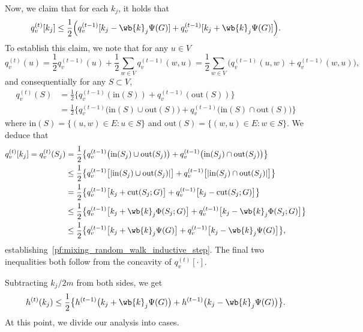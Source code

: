 	Now, we claim that for each $k_j$, it holds that
	\begin{equation}
	\label{pf:mixing_random_walk_inductive_step}
	q_v^{(t)}[k_j] \leq \frac{1}{2}\Bigl(q_v^{(t - 1)}[k_j - \wb{k}_j \Psi(G)] + q_v^{(t - 1)}[k_j + \wb{k}_j \Psi(G)]\Bigr).
	\end{equation}
	To establish this claim, we note that for any $u \in V$
	\begin{equation*}
	q_v^{(t)}(u) = \frac{1}{2}q_v^{(t - 1)}(u) + \frac{1}{2}\sum_{w \in V}q_v^{(t - 1)}(w,u) = \frac{1}{2} \sum_{w \in V} \bigl(q_v^{(t - 1)}(u,w) + q_v^{(t - 1)}(w,u)\bigr),
	\end{equation*}
	and consequentially for any $S \subset V$,
	\begin{align*}
	q_v^{(t)}(S) & = \frac{1}{2}\bigl\{q_v^{(t - 1)}(\mathrm{in}(S)) +  q_v^{(t - 1)}(\mathrm{out}(S))\bigr\} \\
	& = \frac{1}{2}\bigl\{q_v^{(t - 1)}\bigl(\mathrm{in}(S) \cup \mathrm{out}(S)\bigr) +  q_v^{(t - 1)}\bigl(\mathrm{in}(S) \cap \mathrm{out}(S)\bigr)\bigr\}
	\end{align*}
	where $\mathrm{in}(S) = \{(u,w) \in E: u \in S\}$ and $\mathrm{out}(S) = \{(w,u) \in E: w \in S\}$. We deduce that
	\begin{align*}
	q_v^{(t)}[k_j] = q_v^{(t)}(S_j) & = \frac{1}{2}\bigl\{q_v^{(t - 1)}\bigl(\mathrm{in}(S_j) \cup \mathrm{out}(S_j)\bigr) +  q_v^{(t - 1)}\bigl(\mathrm{in}(S_j) \cap \mathrm{out}(S_j)\bigr)\bigr\} \\
	& \leq \frac{1}{2}\bigl\{q_v^{(t - 1)}\bigl[|\mathrm{in}(S_j) \cup \mathrm{out}(S_j)|\bigr] +  q_v^{(t - 1)}\bigl[|\mathrm{in}(S_j) \cap \mathrm{out}(S_j)|\bigr]\bigr\} \\
	& = \frac{1}{2}\bigl\{q_v^{(t - 1)}\bigl[k_j + \mathrm{cut}(S_j;G)\bigr] +  q_v^{(t - 1)}\bigl[k_j - \mathrm{cut}(S_j;G)\bigr]\bigr\} \\
	& \leq \frac{1}{2}\bigl\{q_v^{(t - 1)}\bigl[k_j + \wb{k}_j\Phi(S_j;G)\bigr] +  q_v^{(t - 1)}\bigl[k_j - \wb{k}_j\Phi(S_j;G)\bigr]\bigr\} \\
	& \leq \frac{1}{2}\bigl\{q_v^{(t - 1)}\bigl[k_j + \wb{k}_j\Psi(G)\bigr] +  q_v^{(t - 1)}\bigl[k_j - \wb{k}_j\Psi(G)\bigr]\bigr\},
	\end{align*}
	establishing~\eqref{pf:mixing_random_walk_inductive_step}. The final two inequalities both follow from the concavity of $q_v^{(t)}[\cdot]$. 
	
	Subtracting $k_j/2m$ from both sides, we get
	\begin{equation}
	\label{pf:mixing_random_walk_inductive_step_h}
	h^{(t)}(k_j) \leq \frac{1}{2}\bigl\{h^{(t - 1)}\bigl(k_j + \wb{k}_j\Psi(G)\bigr)+  h^{(t - 1)}\bigl(k_j - \wb{k}_j\Psi(G)\bigr)\bigr\}.
	\end{equation}
	At this point, we divide our analysis into cases.
	
